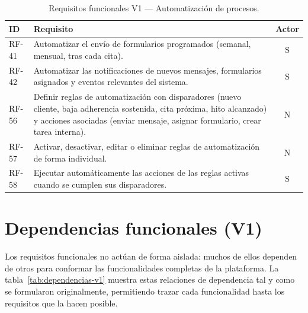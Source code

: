 \begin{table}[htbp]
\centering
\small
\begin{tabular}{|l|p{10.5cm}|c|}
\hline
\textbf{ID} & \textbf{Requisito} & \textbf{Actor} \\
\hline
RF-41 & Automatizar el envío de formularios programados (semanal, mensual, tras cada cita). & S \\
\hline
RF-42 & Automatizar las notificaciones de nuevos mensajes, formularios asignados y eventos relevantes del sistema. & S \\
\hline
RF-56 & Definir reglas de automatización con disparadores (nuevo cliente, baja adherencia sostenida, cita próxima, hito alcanzado) y acciones asociadas (enviar mensaje, asignar formulario, crear tarea interna). & N \\
\hline
RF-57 & Activar, desactivar, editar o eliminar reglas de automatización de forma individual. & N \\
\hline
RF-58 & Ejecutar automáticamente las acciones de las reglas activas cuando se cumplen sus disparadores. & S \\
\hline
\end{tabular}
\caption{Requisitos funcionales V1 --- Automatización de procesos.}
\label{tab:rf-automatizacion-v1}
\end{table}


\section{Dependencias funcionales (V1)}
\label{sec:dependencias-v1}

Los requisitos funcionales no actúan de forma aislada: muchos de ellos dependen de otros para conformar las funcionalidades completas de la plataforma. La tabla~\ref{tab:dependencias-v1} muestra estas relaciones de dependencia tal y como se formularon originalmente, permitiendo trazar cada funcionalidad hasta los requisitos que la hacen posible.

